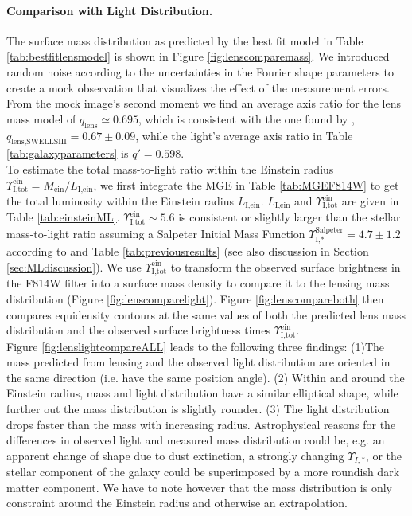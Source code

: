 \paragraph{Comparison with Light Distribution.} The surface mass distribution as predicted by the best fit model in Table \ref{tab:bestfitlensmodel} is shown in Figure \ref{fig:lenscomparemass}. We introduced random noise according to the uncertainties in the Fourier shape parameters to create a mock observation that visualizes the effect of the measurement errors. From the mock image's second moment we find an average axis ratio for the lens mass model of $q_\text{lens} \simeq 0.695$, which is consistent with the one found by \citet{SWELLSIII}, $q_\text{lens,SWELLSIII} = 0.67 \pm 0.09$, while the light's average axis ratio in Table \ref{tab:galaxyparameters} is $q' = 0.598$.
\\To estimate the total mass-to-light ratio within the Einstein radius $\Upsilon_\text{I,tot}^\text{ein} = M_\text{ein} / L_\text{I,ein}$, we first integrate the MGE in Table \ref{tab:MGEF814W} to get the total luminosity within the Einstein radius $L_\text{I,ein}$. $L_\text{I,ein}$ and $\Upsilon_\text{I,tot}^\text{ein}$ are given in Table \ref{tab:einsteinML}. $\Upsilon_\text{I,tot}^\text{ein} \sim 5.6$ is consistent or slightly larger than the stellar mass-to-light ratio assuming a Salpeter Initial Mass Function $\Upsilon_\text{I,*}^\text{Salpeter} = 4.7 \pm 1.2$ according to \citet{SWELLSI} and Table \ref{tab:previousresults} (see also discussion in Section \ref{sec:MLdiscussion}). We use $\Upsilon_\text{I,tot}^\text{ein}$ to transform the observed surface brightness in the F814W filter into a surface mass density to compare it to the lensing mass distribution (Figure \ref{fig:lenscomparelight}). Figure \ref{fig:lenscompareboth} then compares equidensity contours at the same values of both the predicted lens mass distribution and the observed surface brightness times $\Upsilon_\text{I,tot}^\text{ein}$.
\\Figure \ref{fig:lenslightcompareALL} leads to the following three findings: (1)The mass predicted from lensing and the observed light distribution are oriented in the same direction (i.e. have the same position angle). (2) Within and around the Einstein radius, mass and light distribution have a similar elliptical shape, while further out the mass distribution is slightly rounder. (3) The light distribution drops faster than the mass with increasing radius. Astrophysical reasons for the differences in observed light and measured mass distribution could be, e.g. an apparent change of shape due to dust extinction, a strongly changing $\Upsilon_{I,*}$, or the stellar component of the galaxy could be superimposed by a more roundish dark matter component.  We have to note however that the mass distribution is only constraint around the Einstein radius and otherwise an extrapolation. 

